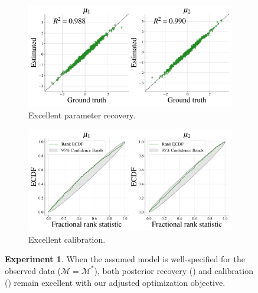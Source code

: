 \documentclass[twoside,11pt]{article}
\newcommand{\numberGaussianMeans}{1}
\newcommand{\0}{\boldsymbol{0}}
\newcommand{\M}{\mathcal{M}}
\begin{document}
\begin{figure}[t]
    \centering
    \begin{subfigure}[t]{.49\textwidth}
     \includegraphics[width=\linewidth]{plots/abf_mvn_means_well_specified_recovery_sufficient.pdf}
     \caption{Excellent parameter recovery.}
     \label{fig:mvn:well-specified-performance:recovery}
    \end{subfigure}
    \hfill
    \begin{subfigure}[t]{.49\textwidth}
     \includegraphics[width=\linewidth]{plots/abf_mvn_means_well_specified_calibration_sufficient.pdf}
     \caption{Excellent calibration.}
     \label{fig:mvn:well-specified-performance:calibration}
    \end{subfigure}
    \caption{\textbf{Experiment \numberGaussianMeans}. When the assumed model is well-specified for the observed data ($\M=\M^*$), both posterior recovery () and calibration () remain excellent with our adjusted optimization objective.}
    \label{fig:mvn:well-specified-performance}
\end{figure}
\end{document}
